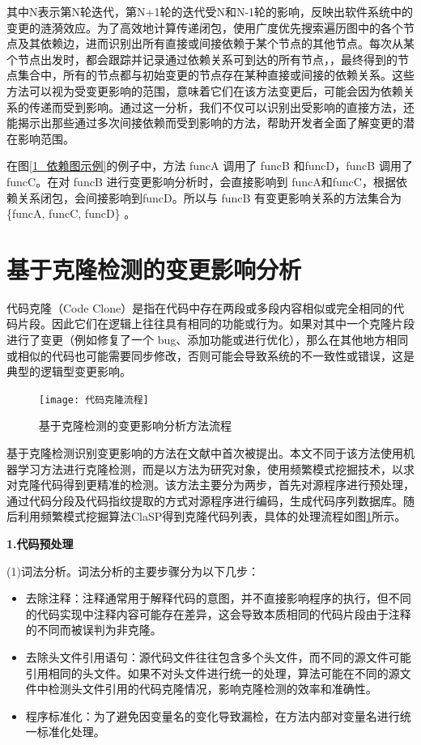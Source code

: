 其中N表示第N轮迭代，第N+1轮的迭代受N和N-1轮的影响，反映出软件系统中的变更的涟漪效应。为了高效地计算传递闭包，使用广度优先搜索遍历图中的各个节点及其依赖边，进而识别出所有直接或间接依赖于某个节点的其他节点。每次从某个节点出发时，都会跟踪并记录通过依赖关系可到达的所有节点，，最终得到的节点集合中，所有的节点都与初始变更的节点存在某种直接或间接的依赖关系。这些方法可以视为受变更影响的范围，意味着它们在该方法变更后，可能会因为依赖关系的传递而受到影响。通过这一分析，我们不仅可以识别出受影响的直接方法，还能揭示出那些通过多次间接依赖而受到影响的方法，帮助开发者全面了解变更的潜在影响范围。


在图\ref{1_依赖图示例}的例子中，方法 funcA 调用了 funcB 和funcD，funcB 调用了 funcC。在对 funcB 进行变更影响分析时，会直接影响到 funcA和funcC，根据依赖关系闭包，会间接影响到funcD。所以与 funcB 有变更影响关系的方法集合为\{funcA, funcC, funcD\} 。


\section{基于克隆检测的变更影响分析}
代码克隆（Code Clone）是指在代码中存在两段或多段内容相似或完全相同的代码片段。因此它们在逻辑上往往具有相同的功能或行为。如果对其中一个克隆片段进行了变更（例如修复了一个 bug、添加功能或进行优化），那么在其他地方相同或相似的代码也可能需要同步修改，否则可能会导致系统的不一致性或错误，这是典型的逻辑型变更影响。

\begin{figure}[htbp]
\centering
\texttt{[image: 代码克隆流程]}
\caption{基于克隆检测的变更影响分析方法流程}
\label{1_基于代码克隆的变更影响分析方法流程}
\end{figure}

基于克隆检测识别变更影响的方法在文献\cite{daipeng2024software}中首次被提出。本文不同于该方法使用机器学习方法进行克隆检测，而是以方法为研究对象，使用频繁模式挖掘技术，以求对克隆代码得到更精准的检测。该方法主要分为两步，首先对源程序进行预处理，通过代码分段及代码指纹提取的方式对源程序进行编码，生成代码序列数据库。随后利用频繁模式挖掘算法ClaSP得到克隆代码列表，具体的处理流程如图\ref{1_基于代码克隆的变更影响分析方法流程}所示。


\noindent \textbf{1.代码预处理}

(1)词法分析。词法分析的主要步骤分为以下几步：

\begin{itemize}
    \item 去除注释：注释通常用于解释代码的意图，并不直接影响程序的执行，但不同的代码实现中注释内容可能存在差异，这会导致本质相同的代码片段由于注释的不同而被误判为非克隆。
    
    \item 去除头文件引用语句：源代码文件往往包含多个头文件，而不同的源文件可能引用相同的头文件。如果不对头文件进行统一的处理，算法可能在不同的源文件中检测头文件引用的代码克隆情况，影响克隆检测的效率和准确性。
    
    \item 程序标准化：为了避免因变量名的变化导致漏检，在方法内部对变量名进行统一标准化处理。

\end{itemize}

